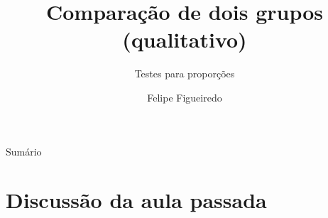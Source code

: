 \documentclass{beamer}
\title%
{Comparação de dois grupos (qualitativo)}
\subtitle
{Testes para proporções} %
\author%
{Felipe Figueiredo}%
\institute[INTO] %
{Instituto Nacional de Traumatologia e Ortopedia
}
\date%
{}
\begin{document}
\begin{frame}
  \titlepage
\end{frame}

\begin{frame}{Sumário}
  \tableofcontents
\end{frame}








\section{Discussão da aula passada}
\end{document}
